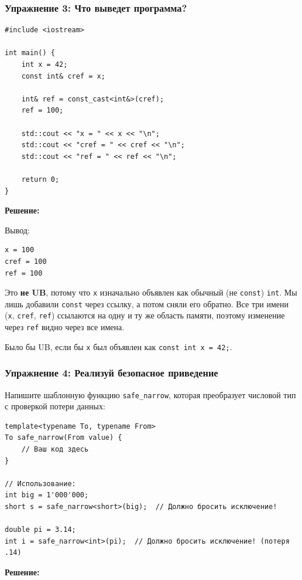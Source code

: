 \documentclass[a4paper,12pt]{article}
\begin{document}
\subsubsection{Упражнение 3: Что выведет программа?}

\begin{lstlisting}
#include <iostream>

int main() {
    int x = 42;
    const int& cref = x;

    int& ref = const_cast<int&>(cref);
    ref = 100;

    std::cout << "x = " << x << "\n";
    std::cout << "cref = " << cref << "\n";
    std::cout << "ref = " << ref << "\n";

    return 0;
}
\end{lstlisting}

\textbf{Решение:}

Вывод:
\begin{lstlisting}[numbers=none]
x = 100
cref = 100
ref = 100
\end{lstlisting}

Это \textbf{не UB}, потому что \texttt{x} изначально объявлен как обычный
(не \texttt{const}) \texttt{int}. Мы лишь добавили \texttt{const} через ссылку,
а потом сняли его обратно. Все три имени (\texttt{x}, \texttt{cref}, \texttt{ref})
ссылаются на одну и ту же область памяти, поэтому изменение через \texttt{ref}
видно через все имена.

Было бы UB, если бы \texttt{x} был объявлен как \texttt{const int x = 42;}.

\subsubsection{Упражнение 4: Реализуй безопасное приведение}

Напишите шаблонную функцию \texttt{safe\_narrow}, которая преобразует числовой
тип с проверкой потери данных:

\begin{lstlisting}
template<typename To, typename From>
To safe_narrow(From value) {
    // Ваш код здесь
}

// Использование:
int big = 1'000'000;
short s = safe_narrow<short>(big);  // Должно бросить исключение!

double pi = 3.14;
int i = safe_narrow<int>(pi);  // Должно бросить исключение! (потеря .14)
\end{lstlisting}

\textbf{Решение:}
\end{document}
